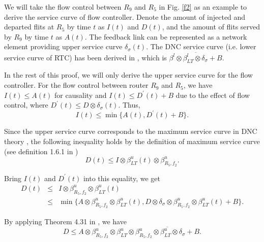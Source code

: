 \documentclass[preprint]{elsarticle}
\begin{document}
\begin{pf}
We will take the flow control between $R_9$ and $R_5$ in Fig. \ref{f2} as an example to derive the service curve of flow controller. Denote the amount of injected and departed flits at $R_5$ by time $t$ as $I(t)$ and $D(t)$, and the amount of flits served by $R_9$ by time $t$ as $A(t)$. The feedback link can be represented as a network element providing upper service curve $\delta_\sigma(t)$. The DNC service curve (i.e. lower service curve of RTC) has been derived in \cite{qian2009analysis}, which is $\overline{\beta^l\otimes\beta_{LT}^l\otimes\delta_{\sigma}+B}$.

In the rest of this proof, we will only derive the upper service curve for the flow controller. For the flow control between router $R_9$ and $R_5$, we have $I(t)\leq A(t)$ for causality and $I(t)\leq D^\prime(t)+B$ due to the effect of flow control, where $D^\prime(t)\leq D\otimes\delta_\sigma(t)$. Thus, $$I(t)\leq\min\{A(t),D^\prime(t)+B\}.$$

Since the upper service curve corresponds to the maximum service curve in DNC theory \cite{Boudec2001Network}, the following inequality holds by the definition of maximum service curve (see definition 1.6.1 in \cite{Boudec2001Network})
$$D(t)\leq I\otimes \beta_{LT}^u(t)\otimes\beta_{R_5,f_2}^u.$$

Bring $I(t)$ and $D^\prime(t)$ into this equality, we get
\begin{eqnarray*}
D(t)&\leq& I\otimes \beta_{R_5,f_2}^u\otimes\beta_{LT}^u(t)\\
&\leq& \min\{A\otimes \beta^u_{R_5,f_2}\otimes\beta_{LT}^u(t),D\otimes\delta_\sigma\otimes \beta_{R_5,f_2}^u\otimes\beta_{LT}^u(t)+B\}.
\end{eqnarray*}

By applying Theorem 4.31 in \cite{Boudec2001Network}, we have
$$D\leq A\otimes \beta^u_{R_5,f_2}\otimes\beta_{LT}^u\otimes\overline{\beta_{R_5,f_2}^u\otimes\beta_{LT}^u\otimes\delta_\sigma+B}.$$


\end{pf}
\end{document}
